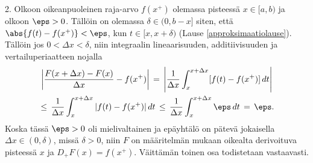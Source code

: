 2. Olkoon oikeanpuoleinen raja-arvo $f(x^+)$ olemassa pisteessä $x\in[a,b)$ ja olkoon $\eps>0$.
Tällöin on olemassa $\delta\in(0,b-x]$ siten, että $\abs{f(t)-f(x^+)}<\eps$, kun 
$t\in[x,x+\delta)$ (Lause \ref{approksimaatiolause}). Tällöin jos $0<\Delta x<\delta$, niin
integraalin lineaarisuuden, additiivisuuden ja vertailuperiaatteen nojalla
\begin{multline*}
\left|\frac{F(x+\Delta x)-F(x)}{\Delta x}-f(x^+)\right| 
               \,=\, \left|\frac{1}{\Delta x}\int_x^{x+\Delta x} [f(t)-f(x^+)]\,dt\right| \\
               \,\le\, \frac{1}{\Delta x}\int_x^{x+\Delta x} |f(t)-f(x^+)|\,dt
               \,\le\, \frac{1}{\Delta x}\int_x^{x+\Delta x} \eps\,dt \,=\,\eps.
\end{multline*}
Koska tässä $\eps>0$ oli mielivaltainen ja epäyhtälö on pätevä jokaisella 
$\Delta x\in(0,\delta)$, missä $\delta>0$, niin $F$ on määritelmän mukaan oikealta derivoituva
pisteessä $x$ ja $D_+F(x)=f(x^+)$. Väittämän toinen osa todistetaan vastaavasti. \loppu
